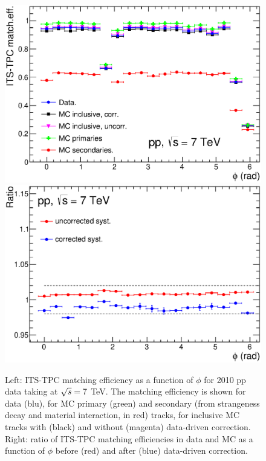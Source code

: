 \begin{figure}[!htb]
\begin{center}
\includegraphics[width=.49\textwidth]{FigCap4/ITSTPCmatchEff_10bpass4_vsPhi.eps}
\includegraphics[width=.49\textwidth]{FigCap4/ITSTPCmatchEffSyst_10bpass4_vsPhi.eps}
\caption{Left: ITS-TPC matching efficiency as a function of $\phi$ for 2010 pp data taking at $\sqrt{s} = 7$ TeV. The matching efficiency is shown for data (blu), for MC primary (green) and secondary (from strangeness decay and material interaction, in red) tracks, for inclusive MC tracks with (black) and without (magenta) data-driven correction. Right: ratio of ITS-TPC matching efficiencies in data and MC as a function of $\phi$ before (red) and after (blue) data-driven correction.}
\label{fig:CorrMatchEffVsPhi}
\end{center}
\end{figure}

